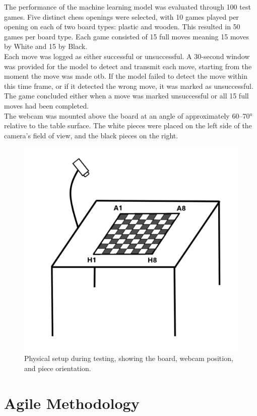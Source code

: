 The performance of the machine learning model was evaluated through 100 test games. Five distinct chess openings were selected, with 10 games played per opening on each of two board types: plastic and wooden. This resulted in 50 games per board type. Each game consisted of 15 full moves meaning 15 moves by White and 15 by Black. \\

Each move was logged as either successful or unsuccessful. A 30-second window was provided for the model to detect and transmit each move, starting from the moment the move was made \gls{otb}. If the model failed to detect the move within this time frame, or if it detected the wrong move, it was marked as unsuccessful. The game concluded either when a move was marked unsuccessful or all 15 full moves had been completed. \\

The webcam was mounted above the board at an angle of approximately 60–70\si{\degree}
 relative to the table surface. The white pieces were placed on the left side of the camera's field of view, and the black pieces on the right.

\begin{figure}[h!]
    \centering
    \includegraphics[width=0.75\linewidth]{figures/methods/testing/setup.png}
    \caption[Setup during testing]{Physical setup during testing, showing the board, webcam position, and piece orientation.}
    \label{fig:setup}
\end{figure}



\section{Agile Methodology}
\label{sec:development-methodology}

